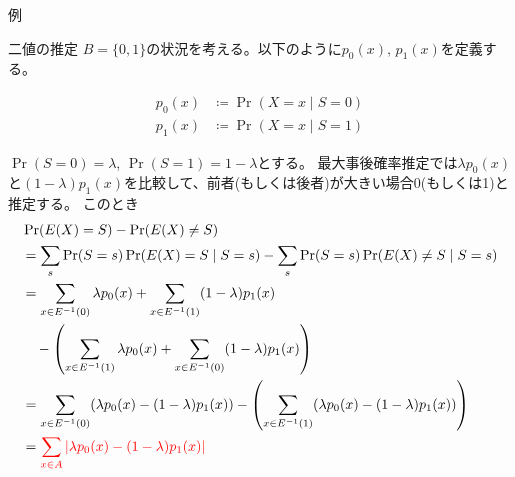 \documentclass[lualatex,handout]{beamer}
\newcommand{\mycolor}[2]{%
  \begingroup
  \colorlet{currentcolor}{.}%
  \color{#1}#2%
  \color{currentcolor}%
  \endgroup
}
\newcommand{\emm}[1]{\mycolor{red}{#1}}
\theoremstyle{definition}
\begin{document}
\begin{frame}{例}

\end{frame}
\fi

\begin{frame}{二値の推定}
\footnotesize
$B = \{0,1\}$の状況を考える。以下のように$p_0(x),\,p_1(x)$を定義する。

\begin{align*}
p_0(x) &\coloneq \Pr(X=x\mid S=0)\\
p_1(x) &\coloneq \Pr(X=x\mid S=1)
\end{align*}

\vspace{.5em}
$\Pr(S=0)=\lambda$, $\Pr(S=1)=1-\lambda$とする。
最大事後確率推定では$\lambda p_0(x)$と$(1-\lambda)p_1(x)$を比較して、前者(もしくは後者)が大きい場合0(もしくは1)と推定する。
このとき
\begin{align*}
&\Pr(E(X) = S) - \Pr(E(X)\ne S)\\
&= \sum_s \Pr(S=s) \Pr(E(X) = S\mid S = s)
- \sum_s \Pr(S=s) \Pr(E(X) \ne S\mid S = s)\\
&=\sum_{x\in E^{-1}(0)} \lambda p_0(x) + \sum_{x\in E^{-1}(1)} (1-\lambda)p_1(x)\\
&\quad -\left(\sum_{x\in E^{-1}(1)} \lambda p_0(x) + \sum_{x\in E^{-1}(0)} (1-\lambda)p_1(x)\right)\\
&=\sum_{x\in E^{-1}(0)} (\lambda p_0(x) - (1-\lambda)p_1(x))
-\left(\sum_{x\in E^{-1}(1)} (\lambda p_0(x) - (1-\lambda)p_1(x))\right)\\
&=\emm{\sum_{x\in A} \left|\lambda p_0(x) - (1-\lambda)p_1(x)\right|}
\end{align*}
\end{frame}

\end{document}

